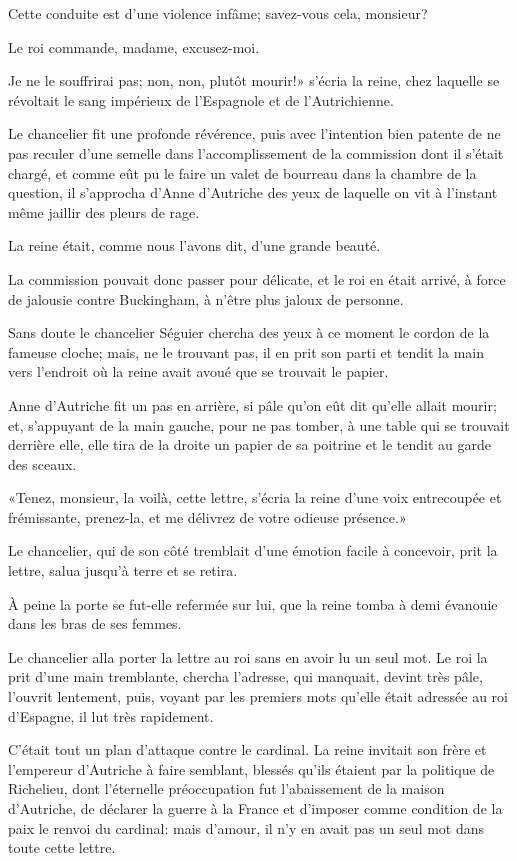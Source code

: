 \speak  Cette conduite est d'une violence infâme; savez-vous cela, monsieur? 

\speak  Le roi commande, madame, excusez-moi. 

\speak  Je ne le souffrirai pas; non, non, plutôt mourir!» s'écria la reine, chez laquelle se révoltait le sang impérieux de l'Espagnole et de l'Autrichienne. 

Le chancelier fit une profonde révérence, puis avec l'intention bien patente de ne pas reculer d'une semelle dans l'accomplissement de la commission dont il s'était chargé, et comme eût pu le faire un valet de bourreau dans la chambre de la question, il s'approcha d'Anne d'Autriche des yeux de laquelle on vit à l'instant même jaillir des pleurs de rage. 

La reine était, comme nous l'avons dit, d'une grande beauté. 

La commission pouvait donc passer pour délicate, et le roi en était arrivé, à force de jalousie contre Buckingham, à n'être plus jaloux de personne. 

Sans doute le chancelier Séguier chercha des yeux à ce moment le cordon de la fameuse cloche; mais, ne le trouvant pas, il en prit son parti et tendit la main vers l'endroit où la reine avait avoué que se trouvait le papier. 

Anne d'Autriche fit un pas en arrière, si pâle qu'on eût dit qu'elle allait mourir; et, s'appuyant de la main gauche, pour ne pas tomber, à une table qui se trouvait derrière elle, elle tira de la droite un papier de sa poitrine et le tendit au garde des sceaux. 

«Tenez, monsieur, la voilà, cette lettre, s'écria la reine d'une voix entrecoupée et frémissante, prenez-la, et me délivrez de votre odieuse présence.» 

Le chancelier, qui de son côté tremblait d'une émotion facile à concevoir, prit la lettre, salua jusqu'à terre et se retira. 

À peine la porte se fut-elle refermée sur lui, que la reine tomba à demi évanouie dans les bras de ses femmes. 

Le chancelier alla porter la lettre au roi sans en avoir lu un seul mot. Le roi la prit d'une main tremblante, chercha l'adresse, qui manquait, devint très pâle, l'ouvrit lentement, puis, voyant par les premiers mots qu'elle était adressée au roi d'Espagne, il lut très rapidement. 

C'était tout un plan d'attaque contre le cardinal. La reine invitait son frère et l'empereur d'Autriche à faire semblant, blessés qu'ils étaient par la politique de Richelieu, dont l'éternelle préoccupation fut l'abaissement de la maison d'Autriche, de déclarer la guerre à la France et d'imposer comme condition de la paix le renvoi du cardinal: mais d'amour, il n'y en avait pas un seul mot dans toute cette lettre. 

